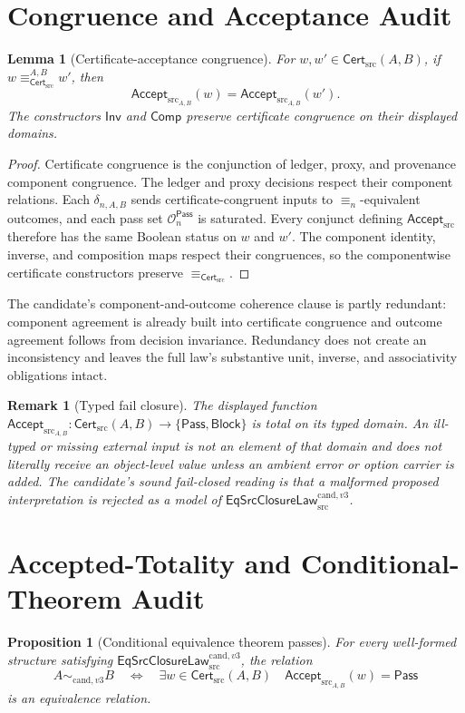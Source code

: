 \documentclass[11pt]{article}
\newtheorem{lemma}{Lemma}
\newtheorem{proposition}{Proposition}
\newtheorem{remark}{Remark}
\newcommand{\Cert}{\mathsf{Cert}_{\mathrm{src}}}
\newcommand{\Accept}{\mathsf{Accept}_{\mathrm{src}}}
\newcommand{\Law}{\mathsf{EqSrcClosureLaw}^{\mathrm{cand},v3}_{\mathrm{src}}}
\newcommand{\Pass}{\mathsf{Pass}}
\newcommand{\Block}{\mathsf{Block}}
\begin{document}
\section{Congruence and Acceptance Audit}

\begin{lemma}[Certificate-acceptance congruence]
For \(w,w'\in\Cert(A,B)\), if
\(w\equiv_{\Cert}^{A,B}w'\), then
\[
 \Accept_{A,B}(w)=\Accept_{A,B}(w').
\]
The constructors \(\mathsf{Inv}\) and \(\mathsf{Comp}\) preserve
certificate congruence on their displayed domains.
\end{lemma}

\begin{proof}
Certificate congruence is the conjunction of ledger, proxy, and provenance
component congruence. The ledger and proxy decisions respect their component
relations. Each \(\delta_{n,A,B}\) sends certificate-congruent inputs to
\(\equiv_n\)-equivalent outcomes, and each pass set
\(\mathcal O_n^{\Pass}\) is saturated. Every conjunct defining \(\Accept\)
therefore has the same Boolean status on \(w\) and \(w'\). The component
identity, inverse, and composition maps respect their congruences, so the
componentwise certificate constructors preserve \(\equiv_{\Cert}\).
\end{proof}

The candidate's component-and-outcome coherence clause is partly redundant:
component agreement is already built into certificate congruence and outcome
agreement follows from decision invariance. Redundancy does not create an
inconsistency and leaves the full law's substantive unit, inverse, and
associativity obligations intact.

\begin{remark}[Typed fail closure]
The displayed function
\(\Accept_{A,B}:\Cert(A,B)\to\{\Pass,\Block\}\) is total on its typed domain.
An ill-typed or missing external input is not an element of that domain and
does not literally receive an object-level value unless an ambient error or
option carrier is added. The candidate's sound fail-closed reading is that a
malformed proposed interpretation is rejected as a model of \(\Law\).
\end{remark}

\section{Accepted-Totality and Conditional-Theorem Audit}

\begin{proposition}[Conditional equivalence theorem passes]
For every well-formed structure satisfying \(\Law\), the relation
\[
 A\sim_{\mathrm{cand},v3}B
 \quad\Longleftrightarrow\quad
 \exists w\in\Cert(A,B)\quad\Accept_{A,B}(w)=\Pass
\]
is an equivalence relation.
\end{proposition}
\end{document}
